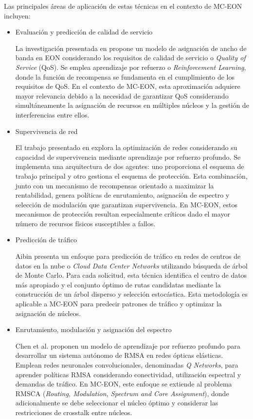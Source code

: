 Las principales áreas de aplicación de estas técnicas en el contexto de MC-EON incluyen:
%


\begin{itemize}
    \item Evaluación y predicción de calidad de servicio
    
    La investigación presentada en \cite{[]} propone un modelo de asignación de ancho de banda en EON considerando los requisitos de calidad de servicio o \textit{Quality of Service} (QoS). Se emplea aprendizaje por refuerzo o \textit{Reinforcement Learning}, donde la función de recompensa se fundamenta en el cumplimiento de los requisitos de QoS. En el contexto de MC-EON, esta aproximación adquiere mayor relevancia debido a la necesidad de garantizar QoS considerando simultáneamente la asignación de recursos en múltiples núcleos y la gestión de interferencias entre ellos.
    
    \item Supervivencia de red
    
    El trabajo presentado en \cite{[]} explora la optimización de redes considerando su capacidad de supervivencia mediante aprendizaje por refuerzo profundo. Se implementa una arquitectura de dos agentes: uno proporciona el esquema de trabajo principal y otro gestiona el esquema de protección. Esta combinación, junto con un mecanismo de recompensas orientado a maximizar la rentabilidad, genera políticas de enrutamiento, asignación de espectro y selección de modulación que garantizan supervivencia. En MC-EON, estos mecanismos de protección resultan especialmente críticos dado el mayor número de recursos físicos susceptibles a fallos.
    
    \item Predicción de tráfico
    
    Aibin \cite{[]} presenta un enfoque para predicción de tráfico en redes de centros de datos en la nube o \textit{Cloud Data Center Networks} utilizando búsqueda de árbol de Monte Carlo. Para cada solicitud, esta técnica identifica el centro de datos más apropiado y el conjunto óptimo de rutas candidatas mediante la construcción de un árbol disperso y selección estocástica. Esta metodología es aplicable a MC-EON para predecir patrones de tráfico y optimizar la asignación de núcleos.
    
    \item Enrutamiento, modulación y asignación del espectro
    
    Chen et al. \cite{[]} proponen un modelo de aprendizaje por refuerzo profundo para desarrollar un sistema autónomo de RMSA en redes ópticas elásticas. Emplean redes neuronales convolucionales, denominadas \textit{Q Networks}, para aprender políticas RMSA considerando conectividad, utilización espectral y demandas de tráfico. En MC-EON, este enfoque se extiende al problema RMSCA (\textit{Routing, Modulation, Spectrum and Core Assignment}), donde adicionalmente se debe seleccionar el núcleo óptimo y considerar las restricciones de crosstalk entre núcleos.
    
\end{itemize}
%

